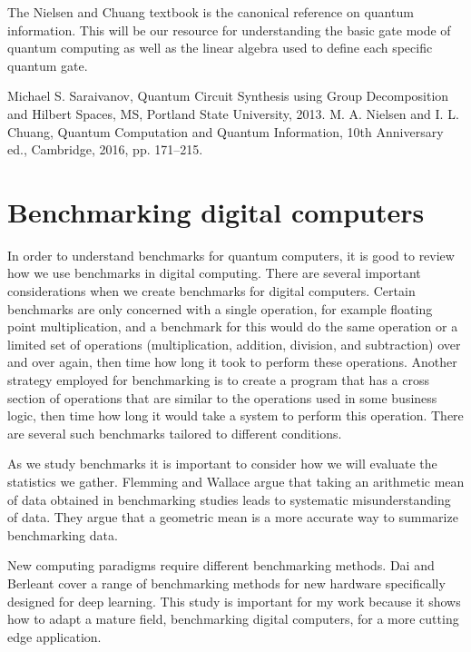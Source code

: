 \documentclass{article}
\begin{document}
The Nielsen and Chuang textbook \cite{b2} is the canonical reference on quantum information. This will be our resource for understanding the basic gate mode of quantum computing as well as the linear algebra used to define each specific quantum gate. 

\begin{thebibliography}{00}
     Michael S. Saraivanov, Quantum Circuit Synthesis using Group Decomposition and Hilbert Spaces, MS, Portland State University, 2013.
     M. A. Nielsen and I. L. Chuang, Quantum Computation and Quantum Information, 10th Anniversary ed., Cambridge, 2016, pp. 171--215.
\end{thebibliography}



\section{Benchmarking digital computers}
In order to understand benchmarks for quantum computers, it is good to review how we use benchmarks in digital computing. There are several important considerations when we create benchmarks for digital computers. Certain benchmarks are only concerned with a single operation, for example floating point multiplication, and a benchmark for this would do the same operation or a limited set of operations (multiplication, addition, division, and subtraction) over and over again, then time how long it took to perform these operations. Another strategy employed for benchmarking is to create a program that has a cross section of operations that are similar to the operations used in some business logic, then time how long it would take a system to perform this operation. There are several such benchmarks tailored to different conditions. 

As we study benchmarks it is important to consider how we will evaluate the statistics we gather. Flemming and Wallace \cite{b3} argue that taking an arithmetic mean of data obtained in benchmarking studies leads to systematic misunderstanding of data. They argue that a geometric mean is a more accurate way to summarize benchmarking data.

New computing paradigms require different benchmarking methods. Dai and Berleant \cite{b4} cover a range of benchmarking methods for new hardware specifically designed for deep learning. This study is important for my work because it shows how to adapt a mature field, benchmarking digital computers, for a more cutting edge application. 
\end{document}
